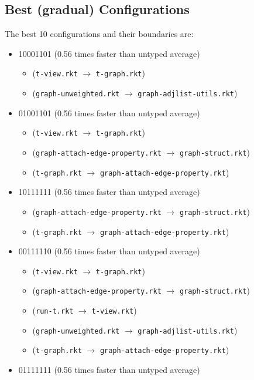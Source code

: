 \documentclass{article}
\newcommand{\mono}[1]{\texttt{#1}}
\begin{document}
\subsection{Best (gradual) Configurations}
The best 10 configurations and their boundaries are:
\begin{itemize}
\item 10001101 (0.56 times faster than untyped average)
  \begin{itemize}
  \item (\mono{t-view.rkt} $\rightarrow$ \mono{t-graph.rkt})
  \item (\mono{graph-unweighted.rkt} $\rightarrow$ \mono{graph-adjlist-utils.rkt})
  \end{itemize}
\item 01001101 (0.56 times faster than untyped average)
  \begin{itemize}
  \item (\mono{t-view.rkt} $\rightarrow$ \mono{t-graph.rkt})
  \item (\mono{graph-attach-edge-property.rkt} $\rightarrow$ \mono{graph-struct.rkt})
  \item (\mono{t-graph.rkt} $\rightarrow$ \mono{graph-attach-edge-property.rkt})
  \end{itemize}
\item 10111111 (0.56 times faster than untyped average)
  \begin{itemize}
  \item (\mono{graph-attach-edge-property.rkt} $\rightarrow$ \mono{graph-struct.rkt})
  \item (\mono{t-graph.rkt} $\rightarrow$ \mono{graph-attach-edge-property.rkt})
  \end{itemize}
\item 00111110 (0.56 times faster than untyped average)
  \begin{itemize}
  \item (\mono{t-view.rkt} $\rightarrow$ \mono{t-graph.rkt})
  \item (\mono{graph-attach-edge-property.rkt} $\rightarrow$ \mono{graph-struct.rkt})
  \item (\mono{run-t.rkt} $\rightarrow$ \mono{t-view.rkt})
  \item (\mono{graph-unweighted.rkt} $\rightarrow$ \mono{graph-adjlist-utils.rkt})
  \item (\mono{t-graph.rkt} $\rightarrow$ \mono{graph-attach-edge-property.rkt})
  \end{itemize}
\item 01111111 (0.56 times faster than untyped average)

\end{itemize}
\end{document}
